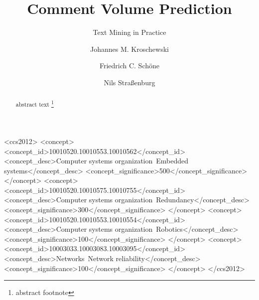 \documentclass[10pt,sigconf]{acmart}
\begin{document}
\title{Comment Volume Prediction}
\subtitle{Text Mining in Practice} %

\author{Johannes M. Kroschewski}

\author{Friedrich C. Schöne}

\author{Nils Straßenburg}

\renewcommand{\shortauthors}{M. Kroschewski et al.}


\begin{abstract}
	abstract text \footnote{abstract footnote}
\end{abstract}

\begin{CCSXML}
<ccs2012>
 <concept>
  <concept_id>10010520.10010553.10010562</concept_id>
  <concept_desc>Computer systems organization~Embedded systems</concept_desc>
  <concept_significance>500</concept_significance>
 </concept>
 <concept>
  <concept_id>10010520.10010575.10010755</concept_id>
  <concept_desc>Computer systems organization~Redundancy</concept_desc>
  <concept_significance>300</concept_significance>
 </concept>
 <concept>
  <concept_id>10010520.10010553.10010554</concept_id>
  <concept_desc>Computer systems organization~Robotics</concept_desc>
  <concept_significance>100</concept_significance>
 </concept>
 <concept>
  <concept_id>10003033.10003083.10003095</concept_id>
  <concept_desc>Networks~Network reliability</concept_desc>
  <concept_significance>100</concept_significance>
 </concept>
</ccs2012>  
\end{CCSXML}

\end{document}
